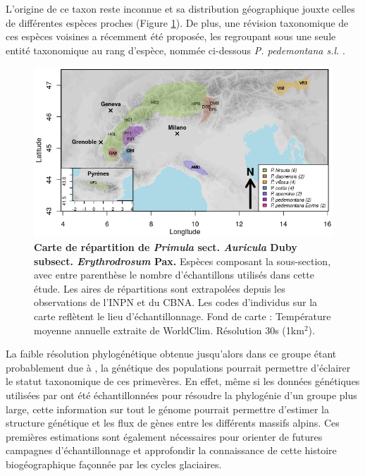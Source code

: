 L'origine de ce taxon reste inconnue et sa distribution géographique jouxte celles de différentes espèces proches (Figure \ref{carte}). De plus, une révision taxonomique de ces espèces voisines a récemment été proposée, les regroupant sous une seule entité taxonomique au rang d'espèce, nommée ci-dessous \textit{P. pedemontana s.l.} \citep{Boucher2016a}. 

\begin{figure}[!ht]
    \centering
    \includegraphics[width=1\textwidth]{fig/carte.png}
    \caption{\textbf{Carte de répartition de \textit{Primula} sect. \textit{Auricula} Duby subsect. \textit{Erythrodrosum} Pax.} Espèces composant la sous-section, avec entre parenthèse le nombre d'échantillons utilisés dans cette étude. Les aires de répartitions sont extrapolées depuis les observations de l'INPN et du CBNA. Les codes d'individus sur la carte reflètent le lieu d'échantillonnage. Fond de carte : Température moyenne annuelle extraite de WorldClim. Résolution 30s (1km$^{2}$).}
    \label{carte}
    \centering
\end{figure} 

La faible résolution phylogénétique obtenue jusqu'alors dans ce groupe étant probablement due à \DIFdelbegin {}\DIFdelend \DIFaddbegin {}\DIFaddend , la génétique des populations pourrait permettre d'éclairer le statut taxonomique de ces primevères. En effet, même si les données génétiques utilisées par \citet{Boucher2016a} ont été échantillonnées pour résoudre la phylogénie d'un groupe plus large, cette information sur tout le génome pourrait permettre d'estimer la structure génétique et les flux de gènes entre les différents massifs alpins. Ces premières estimations sont également nécessaires pour orienter de futures campagnes d'échantillonnage et approfondir la connaissance de cette histoire biogéographique façonnée par les cycles glaciaires. 

